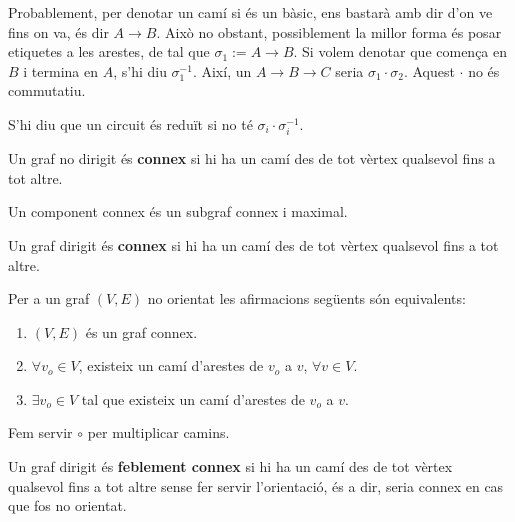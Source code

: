 \documentclass[../main.tex]{subfiles}
\begin{document}
    \begin{notacio}
        Probablement, per denotar un camí si és un bàsic, ens bastarà amb dir d'on ve fins on va, és 
        dir $A\rightarrow B$. Això no obstant, possiblement la millor forma és posar etiquetes a les
        arestes, de tal que $\sigma_1 := A \rightarrow B$. Si volem denotar que comença en $B$ i
        termina en $A$, s'hi diu $\sigma_1^{-1}$. Així, un $A \rightarrow B \rightarrow C$ seria $\sigma_1 \cdot \sigma_2$.
        Aquest $\cdot$ no és commutatiu.
    \end{notacio}
    \begin{definicio}
        S'hi diu que un circuit és reduït si no té $\sigma_i \cdot \sigma_i^{-1}$.
    \end{definicio}
    \begin{definicio}
        Un graf no dirigit és \textbf{connex} si hi ha un camí des de tot vèrtex qualsevol fins a tot 
        altre.
    \end{definicio}
    \begin{definicio}
        Un component connex és un subgraf connex i maximal.
    \end{definicio}
    \begin{definicio}
        Un graf dirigit és \textbf{connex} si hi ha un camí des de tot vèrtex qualsevol fins a tot 
        altre.
    \end{definicio}
    \begin{proposicio}
        Per a un graf $(V, E)$ no orientat les afirmacions següents són equivalents:
        \begin{enumerate}
            \item $(V, E)$ és un graf connex.
            \item $\forall v_o\in V$, existeix un camí d'arestes de $v_o$ a $v$, $\forall v \in V$.
            \item $\exists v_o \in V$ tal que existeix un camí d'arestes de $v_o$ a $v$.
        \end{enumerate}
    \end{proposicio}
    \begin{notacio}
        Fem servir $\circ$ per multiplicar camins. 
    \end{notacio}
    \begin{definicio}
        Un graf dirigit és \textbf{feblement connex} si hi ha un camí des de tot vèrtex qualsevol fins a tot 
        altre sense fer servir l'orientació, és a dir, seria connex en cas que fos no orientat.
    \end{definicio}
\end{document}
